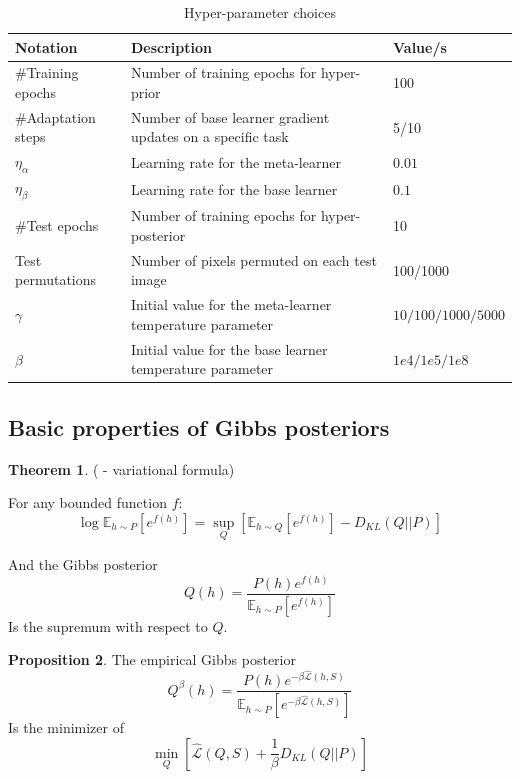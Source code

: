 \documentclass{article}
\theoremstyle{definition}
\newtheorem{theorem}{Theorem}[section]
\newtheorem{proposition}[theorem]{Proposition}
\newcommand{\Expect}[2]{\mathbb{E}_{#1}\left [#2 \right ]}
\begin{document}
\begin{table}[h]	
	
	\centering
	\begin{tabular}{lll}
		\toprule
		Notation   & Description  & Value/s   \\
		\midrule
		\#Training epochs & Number of training epochs for hyper-prior   & 100      \\
		\midrule
		\#Adaptation steps & Number of base learner gradient updates on a specific task   & 5/10      \\
		\midrule
		$\eta_{\alpha}$  & Learning rate for the meta-learner   & $0.01$      \\
		\midrule
		$\eta_{\beta}$  & Learning rate for the base learner   & $0.1$      \\
		\midrule
		\#Test epochs  & Number of training epochs for hyper-posterior   & 10      \\
		\midrule
		Test permutations  & Number of pixels permuted on each test image   & 100/1000      \\
		\midrule
		$\gamma$  & Initial value for the meta-learner temperature parameter   & $10/100/1000/5000$      \\
		\midrule
		$\beta$  & Initial value for the base learner temperature parameter   & $1e4/1e5/1e8$      \\
		\bottomrule
	\end{tabular}
	\caption{Hyper-parameter choices}
	\label{table:hyper-params}
\end{table}


\subsection{Basic properties of Gibbs posteriors} \label{append:gibbs-properties}

\begin{theorem} (\citet{Donsker1975} - variational formula)
	
	For any bounded function $f$:
	\begin{equation*} 
	\log \Expect{h\sim P}{e^{f(h)}}=\sup_{Q}\left[\Expect{h\sim Q}{e^{f(h)}}-D_{KL}(Q||P) \right ]
	\end{equation*}
	
	And the Gibbs posterior 
	$$Q(h)=\frac{P(h)e^{f(h)}}{\Expect{h\sim P}{e^{f(h)}}}$$ 
	Is the supremum with respect to $Q$.
\end{theorem}

\begin{proposition}
	The empirical Gibbs posterior 
	$$Q^\beta(h)=\frac{P(h)e^{-\beta \hat{\mathcal{L}}(h, S)}}{\Expect{h\sim P}{e^{-\beta \hat{\mathcal{L}}(h, S)}}}$$ 
	Is the minimizer of $$\min_{Q}\left[\hat{\mathcal{L}}(Q, S)+\frac{1}{\beta}D_{KL}(Q||P)\right ]$$
\end{proposition}
\end{document}
